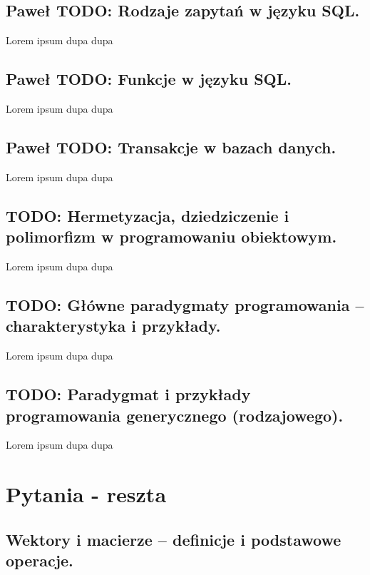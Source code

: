 \documentclass[a4paper,12pt,oneside]{book}
\begin{document}
		\section{\color{green}Paweł \color{red} TODO: Rodzaje zapytań w języku SQL. }
				
				Lorem ipsum dupa dupa
		
		\setcounter{section}{36}
		\section{\color{green}Paweł \color{red} TODO: Funkcje w języku SQL. }
				
				Lorem ipsum dupa dupa
		
		\setcounter{section}{37}
		\section{\color{green}Paweł \color{red} TODO: Transakcje w bazach danych.} 
				
				Lorem ipsum dupa dupa
		
		
		\setcounter{section}{14}
		\section{\color{red} TODO: Hermetyzacja, dziedziczenie i polimorfizm w programowaniu obiektowym. }
				
				Lorem ipsum dupa dupa
				
		\setcounter{section}{47}
		\section{\color{red} TODO: Główne paradygmaty programowania – charakterystyka i przykłady. }
						
				Lorem ipsum dupa dupa
				
		\setcounter{section}{16}
		\section{\color{red} TODO: Paradygmat i przykłady programowania generycznego (rodzajowego). }
								
						Lorem ipsum dupa dupa
	
	\chapter{Pytania - reszta}
		
		\setcounter{section}{0}
		\section{Wektory i macierze – definicje i podstawowe operacje.}
				
\end{document}
